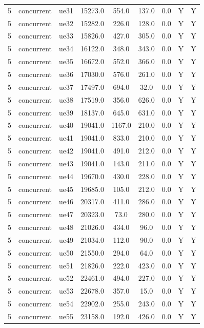 \begin{table}[ht]
\begin{tabular}{|c|c|c|c|c|c|c|c|c|}
5 & concurrent & ue31 & 15273.0 & 554.0 & 137.0 & 0.0 & Y & Y \\
5 & concurrent & ue32 & 15282.0 & 226.0 & 128.0 & 0.0 & Y & Y \\
5 & concurrent & ue33 & 15826.0 & 427.0 & 305.0 & 0.0 & Y & Y \\
5 & concurrent & ue34 & 16122.0 & 348.0 & 343.0 & 0.0 & Y & Y \\
5 & concurrent & ue35 & 16672.0 & 552.0 & 366.0 & 0.0 & Y & Y \\
5 & concurrent & ue36 & 17030.0 & 576.0 & 261.0 & 0.0 & Y & Y \\
5 & concurrent & ue37 & 17497.0 & 694.0 & 32.0 & 0.0 & Y & Y \\
5 & concurrent & ue38 & 17519.0 & 356.0 & 626.0 & 0.0 & Y & Y \\
5 & concurrent & ue39 & 18137.0 & 645.0 & 631.0 & 0.0 & Y & Y \\
5 & concurrent & ue40 & 19041.0 & 1167.0 & 210.0 & 0.0 & Y & Y \\
5 & concurrent & ue41 & 19041.0 & 833.0 & 210.0 & 0.0 & Y & Y \\
5 & concurrent & ue42 & 19041.0 & 491.0 & 212.0 & 0.0 & Y & Y \\
5 & concurrent & ue43 & 19041.0 & 143.0 & 211.0 & 0.0 & Y & Y \\
5 & concurrent & ue44 & 19670.0 & 430.0 & 228.0 & 0.0 & Y & Y \\
5 & concurrent & ue45 & 19685.0 & 105.0 & 212.0 & 0.0 & Y & Y \\
5 & concurrent & ue46 & 20317.0 & 411.0 & 286.0 & 0.0 & Y & Y \\
5 & concurrent & ue47 & 20323.0 & 73.0 & 280.0 & 0.0 & Y & Y \\
5 & concurrent & ue48 & 21026.0 & 434.0 & 96.0 & 0.0 & Y & Y \\
5 & concurrent & ue49 & 21034.0 & 112.0 & 90.0 & 0.0 & Y & Y \\
5 & concurrent & ue50 & 21550.0 & 294.0 & 64.0 & 0.0 & Y & Y \\
5 & concurrent & ue51 & 21826.0 & 222.0 & 423.0 & 0.0 & Y & Y \\
5 & concurrent & ue52 & 22461.0 & 494.0 & 227.0 & 0.0 & Y & Y \\
5 & concurrent & ue53 & 22678.0 & 357.0 & 15.0 & 0.0 & Y & Y \\
5 & concurrent & ue54 & 22902.0 & 255.0 & 243.0 & 0.0 & Y & Y \\
5 & concurrent & ue55 & 23158.0 & 192.0 & 426.0 & 0.0 & Y & Y \\

\end{tabular}
\end{table}
